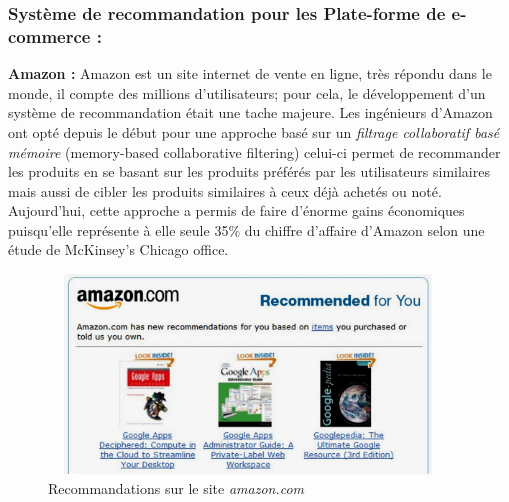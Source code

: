 \subsubsection*{Système de recommandation pour les Plate-forme de e-commerce :}
\textbf{Amazon :} Amazon est un site internet de vente en ligne, très répondu dans le monde, il compte des millions d'utilisateurs; pour cela, le développement d'un système de recommandation était une tache majeure. Les ingénieurs d'Amazon ont opté depuis le début pour une approche basé sur un \emph{filtrage collaboratif basé mémoire} (memory-based collaborative filtering) celui-ci permet de recommander les produits en se basant sur les produits préférés par les utilisateurs similaires mais aussi de cibler les produits similaires à ceux déjà achetés ou noté.\cite{amazon} Aujourd'hui, cette approche a permis de faire d'énorme gains économiques puisqu’elle représente à elle seule 35\% du chiffre d'affaire d'Amazon selon une étude de McKinsey's Chicago office.\\ 
    \begin{figure}[H]
        \centering
            \includegraphics[height=150pt,width=300pt]{img/chapter1/amazon.jpg}
        \caption{Recommandations sur le site \emph{amazon.com}}
    \end{figure}

